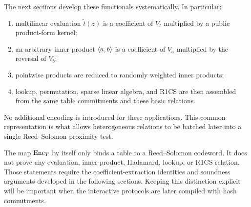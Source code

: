 The next sections develop these functionals systematically.  In particular:
\begin{enumerate}[label=(\arabic*),leftmargin=*]
  \item multilinear evaluation $\widetilde t(z)$ is a coefficient of $V_t$ multiplied by a public product-form kernel;
  \item an arbitrary inner product $\left\langle a,b\right\rangle$ is a coefficient of $V_a$ multiplied by the reversal of $V_b$;
  \item pointwise products are reduced to randomly weighted inner products;
  \item lookup, permutation, sparse linear algebra, and R1CS are then assembled from the same table commitments and these basic relations.
\end{enumerate}
No additional encoding is introduced for these applications.  This common representation is what allows heterogeneous relations to be batched later into a single Reed--Solomon proximity test.

\begin{remark}
\label{rem:commitment-not-proof}
The map $\operatorname{Enc}_T$ by itself only binds a table to a Reed--Solomon codeword.  It does not prove any evaluation, inner-product, Hadamard, lookup, or R1CS relation.  Those statements require the coefficient-extraction identities and soundness arguments developed in the following sections.  Keeping this distinction explicit will be important when the interactive protocols are later compiled with hash commitments.
\end{remark}
